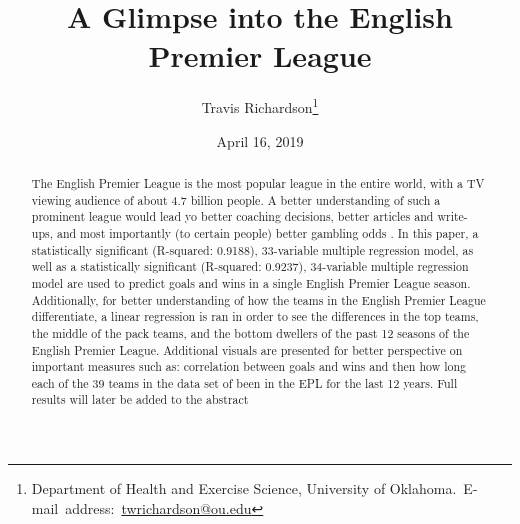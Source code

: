 \documentclass[12pt,english]{article}
\begin{document}
\begin{singlespace}
\title{A Glimpse into the English Premier League}
\end{singlespace}

\author{Travis Richardson\thanks{Department of Health and Exercise Science, University of Oklahoma.\
E-mail~address:~\href{mailto:student.name@ou.edu}{twrichardson@ou.edu}}}

\date{April 16, 2019}

\maketitle

\begin{abstract}
\begin{doublespace}
The English Premier League is the most popular league in the entire world, with a TV viewing audience of about 4.7 billion people. A better understanding of such a prominent league would lead yo better coaching decisions, better articles and write-ups, and most importantly (to certain people) better gambling odds \citep{ulmer}. In this paper, a statistically significant (R-squared:  0.9188), 33-variable multiple regression model, as well as a statistically significant (R-squared:  0.9237), 34-variable multiple regression model are used to predict goals and wins in a single English Premier League season. Additionally, for better understanding of how the teams in the English Premier League differentiate, a linear regression is ran in order to see the differences in the top teams, the middle of the pack teams, and the bottom dwellers of the past 12 seasons of the English Premier League. Additional visuals are presented for better perspective on important measures such as: correlation between goals and wins and then how long each of the 39 teams in the data set of been in the EPL for the last 12 years. Full results will later be added to the abstract
\end{doublespace}

\end{abstract}
\vfill{}


\pagebreak{}
\end{document}
